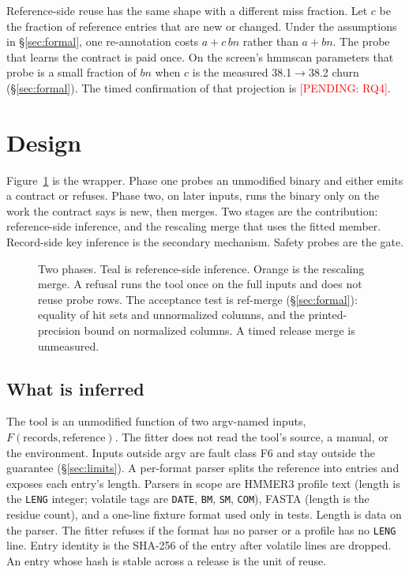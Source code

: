 \documentclass[letterpaper,twocolumn,10pt]{article}
\newcommand{\pending}[1]{\textcolor{red}{[PENDING: #1]}}
\begin{document}
Reference-side reuse has the same shape with a different miss fraction.
Let $c$ be the fraction of reference entries that are new or changed.
Under the assumptions in \S\ref{sec:formal}, one re-annotation costs $a + c\, b n$ rather than $a + b n$.
The probe that learns the contract is paid once.
On the screen's hmmscan parameters that probe is a small fraction of $b n$ when $c$ is the measured 38.1$\to$38.2 churn (\S\ref{sec:formal}).
The timed confirmation of that projection is
\pending{RQ4}.

\section{Design}
\label{sec:design}

Figure~\ref{fig:arch} is the wrapper.
Phase one probes an unmodified binary and either emits a contract or refuses.
Phase two, on later inputs, runs the binary only on the work the contract says is new, then merges.
Two stages are the contribution: reference-side inference, and the rescaling merge that uses the fitted member.
Record-side key inference is the secondary mechanism.
Safety probes are the gate.

\begin{figure}[t]
\centering

\caption{Two phases.
Teal is reference-side inference.
Orange is the rescaling merge.
A refusal runs the tool once on the full inputs and does not reuse probe rows.
The acceptance test is ref-merge (\S\ref{sec:formal}): equality of hit sets and unnormalized columns, and the printed-precision bound on normalized columns.
A timed release merge is unmeasured.}
\label{fig:arch}
\end{figure}

\subsection{What is inferred}
\label{sec:contract}

The tool is an unmodified function of two argv-named inputs, $F(\mathrm{records},\mathrm{reference})$.
The fitter does not read the tool's source, a manual, or the environment.
Inputs outside argv are fault class F6 and stay outside the guarantee (\S\ref{sec:limits}).
A per-format parser splits the reference into entries and exposes each entry's length.
Parsers in scope are HMMER3 profile text (length is the \texttt{LENG} integer; volatile tags are \texttt{DATE}, \texttt{BM}, \texttt{SM}, \texttt{COM}), FASTA (length is the residue count), and a one-line fixture format used only in tests.
Length is data on the parser.
The fitter refuses if the format has no parser or a profile has no \texttt{LENG} line.
Entry identity is the SHA-256 of the entry after volatile lines are dropped.
An entry whose hash is stable across a release is the unit of reuse.
\end{document}

